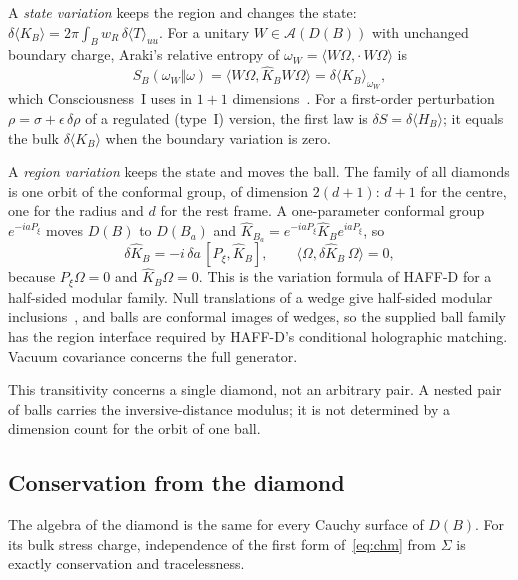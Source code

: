 \documentclass[12pt]{article}
\theoremstyle{definition}
\theoremstyle{remark}
\newcommand{\Khat}{\widehat K}
\newcommand{\dT}{\delta\langle T\rangle}
\newcommand{\ev}[1]{\langle #1\rangle}
\begin{document}
A \emph{state variation} keeps the region and changes the state:
\(\delta\ev{K_B}=2\pi\int_Bw_R\,\dT_{uu}\). For a unitary \(W\in\mathcal A(D(B))\)
with unchanged boundary charge, Araki's
relative entropy of \(\omega_W=\ev{W\Omega,\cdot\,W\Omega}\) is
\begin{equation}\label{eq:relent-unitary}
S_B(\omega_W\Vert\omega)=\ev{W\Omega,\Khat_BW\Omega}=\delta\ev{K_B}_{\omega_W},
\end{equation}
which Consciousness~I uses in \(1+1\) dimensions~\cite{PaperI,Araki1976}. For a first-order
perturbation \(\rho=\sigma+\epsilon\,\delta\rho\) of a regulated (type~I) version, the
first law is \(\delta S=\delta\ev{H_B}\); it equals the bulk
\(\delta\ev{K_B}\) when the boundary variation is zero.

A \emph{region variation} keeps the state and moves the ball. The family of all diamonds
is one orbit of the conformal group, of dimension \(2(d+1)\): \(d+1\) for the centre, one
for the radius and \(d\) for the rest frame. A one-parameter conformal group
\(e^{-iaP_\xi}\) moves \(D(B)\) to \(D(B_a)\) and
\(\Khat_{B_a}=e^{-iaP_\xi}\Khat_Be^{iaP_\xi}\), so
\begin{equation}\label{eq:regionmove}
\delta\Khat_B=-i\,\delta a\,[P_\xi,\Khat_B],\qquad \ev{\Omega,\delta\Khat_B\,\Omega}=0 ,
\end{equation}
because \(P_\xi\Omega=0\) and \(\Khat_B\Omega=0\). This is the variation formula of HAFF-D for a
half-sided modular family. Null translations of a wedge give half-sided modular
inclusions~\cite{Wiesbrock1993,Borchers1992}, and balls are conformal images of wedges, so
the supplied ball family has the region interface required by HAFF-D's conditional holographic matching. Vacuum covariance concerns the full generator.

This transitivity concerns a single diamond, not an arbitrary pair.
A nested pair of balls carries the inversive-distance modulus; it is not
determined by a dimension count for the orbit of one ball.

\subsection{Conservation from the diamond}\label{subsec:conservation}

The algebra of the diamond is the same for every Cauchy surface of \(D(B)\).
For its bulk stress charge, independence of the first form of~\eqref{eq:chm}
from \(\Sigma\) is exactly conservation and
tracelessness.
\end{document}
